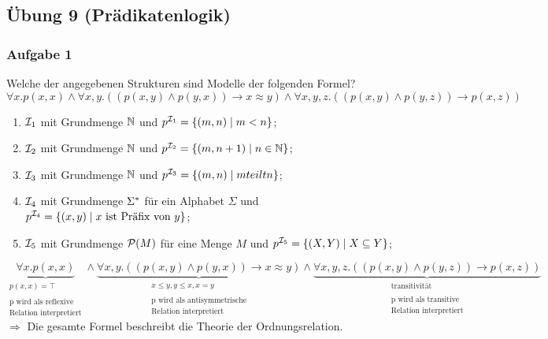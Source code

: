 \subsection*{Übung 9 (Prädikatenlogik)}
\subsubsection*{Aufgabe 1}
Welche der angegebenen Strukturen sind Modelle der folgenden Formel?
\begin{equation*}
\forall x.p(x,x) \land \forall x,y.((p(x,y) \land p(y,x)) \to x \approx y) \land \forall x, y, z.((p(x,y) \land p(y,z)) \to p(x,z))
\end{equation*}
\begin{enumerate}
\item $\mathcal{I}_1$ mit Grundmenge $\mathbb{N}$ und $p^{\mathcal{I}_1} = \{(m,n) \mid m < n\}$;
\item $\mathcal{I}_2$ mit Grundmenge $\mathbb{N}$ und $p^{\mathcal{I}_2} = \{(m,n + 1) \mid n \in \mathbb{N} \}$;
\item $\mathcal{I}_3$ mit Grundmenge $\mathbb{N}$ und $p^{\mathcal{I}_3} = \{(m,n) \mid m teilt n\}$;
\item $\mathcal{I}_4$ mit Grundmenge $\Sigma^{*}$ für ein Alphabet $\Sigma$ und $p^{\mathcal{I}_4} = \{(x,y) \mid x \text{ ist Präfix von } y \}$;
\item $\mathcal{I}_5$ mit Grundmenge $\mathcal{P}(M)$ für eine Menge $M$ und $p^{\mathcal{I}_5} = \{(X,Y) \mid X \subseteq Y \}$;
\end{enumerate}
\LOES 
\begin{equation*}
\underbrace{\forall x.p(x,x)}_{\substack{{p(x,x) = \top} \\ \\ \text{p wird als reflexive} \\ \text{Relation interpretiert}}} \land \underbrace{\forall x,y.((p(x,y) \land p(y,x)) \to x \approx y)}_{\substack{{x \leq y, y \leq x, x=y} \\ \\ \text{p wird als antisymmetrische} \\ \text{Relation interpretiert}}} \land \underbrace{\forall x, y, z.((p(x,y) \land p(y,z)) \to p(x,z))}_{\substack{\text{transitivität} \\ \\ \text{p wird als transitive} \\ \text{Relation interpretiert}}}
\end{equation*}
$\Rightarrow$ Die gesamte Formel beschreibt die Theorie der Ordnungsrelation.
